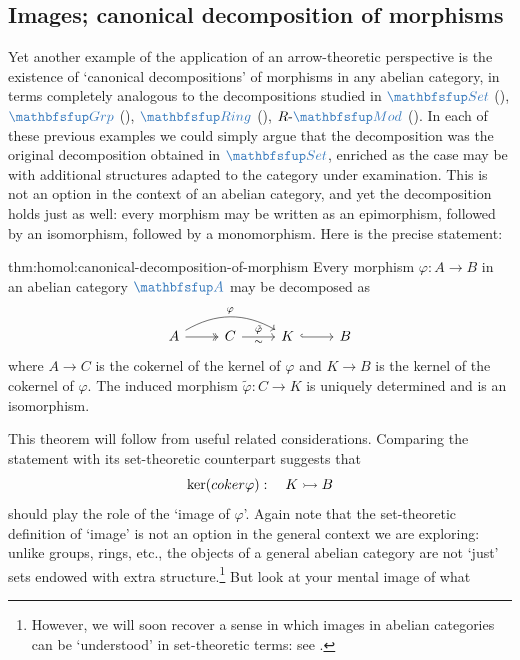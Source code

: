 \subsection{Images; canonical decomposition of morphisms}
\label{subsec:homol:images-canonical-decomposition-of-morphisms}
Yet another example of the application of an arrow-theoretic
perspective is the existence of `canonical decompositions' of
morphisms in any abelian category, in terms completely analogous to
the decompositions studied in $\categ{Set}$
(), $\categ{Grp}$
(), $\categ{Ring}$
(),
$R\text{-}\categ{Mod}$
(). In
each of these previous examples we could simply argue that the
decomposition was the original decomposition obtained in
$\categ{Set}$, enriched as the case may be with additional structures
adapted to the category under examination. This is not an option in
the context of an abelian category, and yet the decomposition holds
just as well: every morphism may be written as an epimorphism,
followed by an isomorphism, followed by a monomorphism.  Here is the
precise statement:
\begin{thm}{}{thm:homol:canonical-decomposition-of-morphism}
  Every morphism $\varphi : A \to B$ in an abelian category
  $\categ{A}$ may be decomposed as
  \[\begin{tikzcd}
      A \arrow[r, two heads] \arrow[rr, bend left, "\varphi"] & C
      \arrow[r, "\tilde{\varphi}", "\sim"'] & K \arrow[r, hook] & B
    \end{tikzcd}\] where $A \to C$ is the cokernel of the kernel of
  $\varphi$ and $K \to B$ is the kernel of the cokernel of
  $\varphi$. The induced morphism $\tilde{\varphi} : C \to K$ is
  uniquely determined and is an isomorphism.
\end{thm}
This theorem will follow from useful related considerations. Comparing
the statement with its set-theoretic counterpart suggests that
\[
  \ker(coker\varphi) : \quad K \rightarrowtail B
\]
should play the role of the `image of $\varphi$'. Again note that the
set-theoretic definition of `image' is not an option in the general
context we are exploring: unlike groups, rings, etc., the objects of a
general abelian category are not `just' sets endowed with extra
structure.\footnote{However, we will soon recover a sense in which
  images in abelian categories can be `understood' in set-theoretic
  terms: see .} But look at your mental image of what
